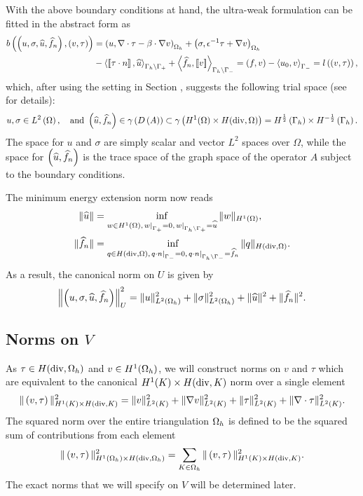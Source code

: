 With the above boundary conditions at hand, the ultra-weak formulation
 can be fitted in the abstract form 
as
\begin{align*}
b\left(\left(u,\sigma, \widehat{u}, \widehat{f}_n\right), \left( v,
\tau\right)\right) &= \left(u,\div \tau - \beta \cdot \grad
v\right)_{\Oh} + \left(\sigma, \epsilon^{-1} \tau + \grad
v\right)_{\Oh} \\
&- \LRa{ \jump{\tau\cdot n}, \widehat{u} }_{\Gh
  \setminus \Gp} + \LRa{ \widehat{f}_n, \jump{v} }_{\Gamma_h \setminus
  \Gm} =  \left(f, v\right) -
\LRa{ u_0, v }_{\Gamma_-} = l\left(\left(v, \tau\right)\right),
\end{align*}
which, after using the setting in Section ,
suggests the following trial space (see \cite{analysisDPG, Bui-ThanhDemkowiczGhattas11b} for details):
\begin{align*}
u, \sigma \in \L, \quad \text{and } \LRp{\uh,\fnh} \in
\gamma\LRp{D\LRp{A}} \subset \gamma\LRp{  H^1(\Omega) \times
H({\rm div}, \Omega)} = H^{\frac{1}{2}}\left(\Gh\right) \times H^{-\frac{1}{2}}\left(\Gh\right).
\end{align*}
The space for $u$ and $\sigma$ are simply scalar and vector $L^2$ spaces over $\Omega$, while the space for $\left(\uh,\fnh\right)$ is the trace space of the graph space of the operator $A$ subject to the boundary conditions.

The minimum energy extension norm  now reads
\begin{align*}
\|\widehat{u}\| &= \inf_{w\in H^1(\Omega),
  \left.w\right|_{\Gamma_+}=0, \left.w\right |_{\Gh\setminus
    \Gamma_+ } = \widehat{u}} \|w\|_{H^1(\Omega)}, \\ \|\widehat{f}_n\|
&= \inf_{q\in H({\rm div},\Omega), \left.q\cdot n\right|_{\Gamma_-}=
  0, \left. q\cdot n \right |_{\Gh\setminus
    \Gamma_-} = \widehat{f}_n}
\|q\|_{H({\rm div},\Omega)}.
\end{align*}
As a result, the canonical norm on $U$ is given by
\[
\left\|\left(u,\sigma,\widehat{u},\widehat{f}_n\right)\right\|_U^2 = 
\|u\|_{L^2(\Oh)}^2 + \|\sigma\|_{L^2(\Oh)}^2 +
\|\widehat{u}\|^2 + \|\widehat{f}_n\|^2.
\]

\subsection{Norms on $V$}

As $\tau \in H({\rm div},\Oh)$ and $v \in H^1(\Oh)$, we will
construct norms on $v$ and $\tau$ 
which are equivalent to the canonical $H^1(K) \times H({\rm div},K)$
norm over a single element
\[
\|\left(v,\tau\right)\|_{H^1(K) \times H({\rm div},K)}^2 =
\|v\|_{L^2(K)}^2 + \|\grad v\|_{L^2(K)}^2 + \|\tau\|_{L^2(K)}^2 +
\|\div \tau\|_{L^2(K)}^2.
\]
The squared norm over the entire triangulation $\Oh$ is defined to be the squared sum of contributions from each element
\[
\|\left(v,\tau\right)\|_{H^1(\Oh) \times H({\rm div},\Oh)}^2
= \sum_{K\in \Oh} \|\left(v,\tau\right)\|_{H^1(K) \times H({\rm
    div},K)}^2.
\]
The exact norms that we will specify on $V$ will be determined later. 

